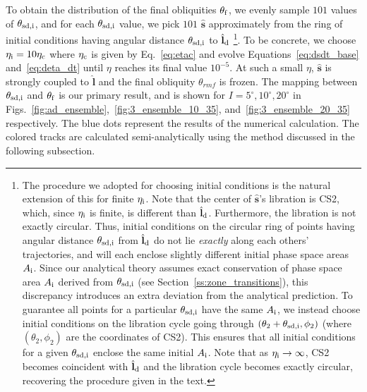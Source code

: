 \documentclass[
        fleqn,
        usenatbib,
        referee,
    ]{mnras}
\newcommand*{\bm}[1]{\boldsymbol{\mathbf{#1}}}
\newcommand*{\uv}[1]{\hat{\bm{#1}}}
\newcommand*{\p}[1]{\left(#1\right)}
\begin{document}
To obtain the distribution of the final obliquities $\theta_{\rm f}$, we evenly
sample $101$ values of $\theta_{\rm sd, i}$, and for each $\theta_{\rm sd, i}$
value, we pick $101$ $\uv{s}$ approximately from the ring of initial conditions
having angular distance $\theta_{\rm sd, i}$ to $\uv{l}_{\rm d}$%
%
\footnote{
The procedure we adopted for choosing initial conditions is the natural
extension of this for finite $\eta_{\rm i}$. Note that the center of $\uv{s}$'s
libration is CS2, which, since $\eta_{\rm i}$ is finite, is different than
$\uv{l}_{\rm d}$. Furthermore, the libration is not exactly circular. Thus,
initial conditions on the circular ring of points having angular distance
$\theta_{\rm sd, i}$ from $\uv{l}_{\rm d}$ do not lie \emph{exactly} along each
others' trajectories, and will each enclose slightly different initial phase
space areas $A_{\rm i}$. Since our analytical theory assumes exact conservation
of phase space area $A_{\rm i}$ derived from $\theta_{\rm sd, i}$ (see
Section~\ref{ss:zone_transitions}), this discrepancy introduces an extra
deviation from the analytical prediction. To guarantee all points for a
particular $\theta_{\rm sd, i}$ have the same $A_{\rm i}$, we instead choose
initial conditions on the libration cycle going through $\p{\theta_2 +
\theta_{\rm sd, i}, \phi_2}$ (where $\p{\theta_2, \phi_2}$ are the coordinates
of CS2). This ensures that all initial conditions for a given $\theta_{\rm sd,
i}$ enclose the same initial $A_{\rm i}$. Note that as $\eta_{\rm i} \to
\infty$, CS2 becomes coincident with $\uv{l}_{\rm d}$ and the libration cycle
becomes exactly circular, recovering the procedure given in the text.}.
%
To be concrete, we choose $\eta_{\rm i} = 10\eta_{\rm c}$ where $\eta_{\rm c}$
is given by Eq.~\eqref{eq:etac} and evolve Equations~\ref{eq:dsdt_base}
and~\ref{eq:deta_dt} until $\eta$ reaches its final value $10^{-5}$. At such a
small $\eta$, $\uv{s}$ is strongly coupled to $\uv{l}$ and the final obliquity
$\theta_{rm f}$ is frozen. The mapping between $\theta_{\rm sd, i}$ and
$\theta_{\rm f}$ is our primary result, and is shown for $I = 5^\circ, 10^\circ,
20^\circ$ in Figs.~\ref{fig:ad_ensemble},~\ref{fig:3_ensemble_10_35},
and~\ref{fig:3_ensemble_20_35} respectively. The blue dots represent the results
of the numerical calculation. The colored tracks are calculated
semi-analytically using the method discussed in the following subsection.
\end{document}
